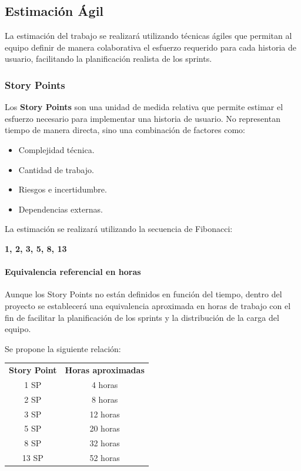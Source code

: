 \documentclass[12pt]{article}
\begin{document}
\subsection{Estimación Ágil}

La estimación del trabajo se realizará utilizando técnicas ágiles que permitan al equipo definir de manera colaborativa el esfuerzo requerido para cada historia de usuario, facilitando la planificación realista de los sprints.

\subsubsection{Story Points}

Los \textbf{Story Points} son una unidad de medida relativa que permite estimar el esfuerzo necesario para implementar una historia de usuario. No representan tiempo de manera directa, sino una combinación de factores como:

\begin{itemize}
    \item Complejidad técnica.
    \item Cantidad de trabajo.
    \item Riesgos e incertidumbre.
    \item Dependencias externas.
\end{itemize}

La estimación se realizará utilizando la secuencia de Fibonacci:

\begin{center}
\textbf{1, 2, 3, 5, 8, 13}
\end{center}

\paragraph{Equivalencia referencial en horas}

Aunque los Story Points no están definidos en función del tiempo, dentro del proyecto se establecerá una equivalencia aproximada en horas de trabajo con el fin de facilitar la planificación de los sprints y la distribución de la carga del equipo.

Se propone la siguiente relación:

\begin{center}
\begin{tabular}{c c}
\textbf{Story Point} & \textbf{Horas aproximadas} \\
1 SP & 4 horas \\
2 SP & 8 horas \\
3 SP & 12 horas \\
5 SP & 20 horas \\
8 SP & 32 horas \\
13 SP & 52 horas \\
\end{tabular}
\end{center}
\end{document}
